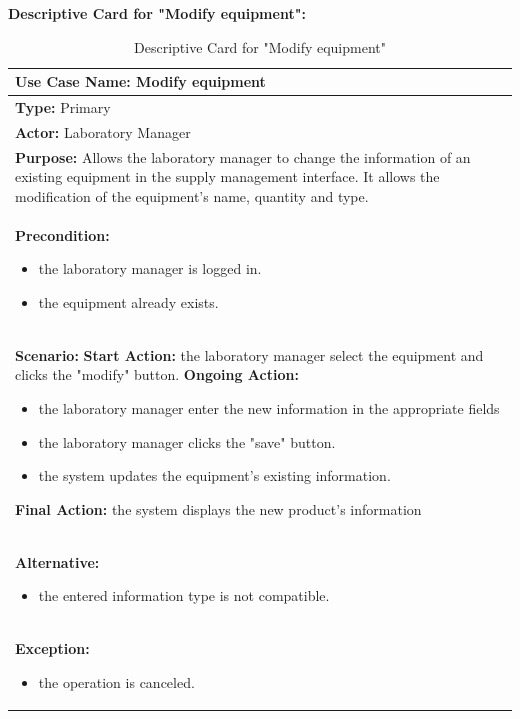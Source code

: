 \documentclass{article}
\begin{document}
\newpage

\textbf{Descriptive Card for "Modify equipment":}

\begin{table}[h]
\setlength{\tabcolsep}{10pt}
\renewcommand{\arraystretch}{1.5}
    \begin{tabular}{|p{\linewidth}|}
        \hline
        \textbf{Use Case Name:} Modify equipment\\ 
        \hline
        \textbf{Type:} Primary\\ 
        \hline
        \textbf{Actor:} Laboratory Manager\\ 
        \hline
        \textbf{Purpose:} Allows the laboratory manager to change the information of an existing equipment in the supply management interface. It allows the modification of the equipment's name, quantity and type.\\ 
        \hline
        \textbf{Precondition:}
        \begin{itemize}
            \item the laboratory manager is logged in.
            \item the equipment already exists.
        \end{itemize}\\ 
        \hline
        \textbf{Scenario:}
        \vspace{0.2cm}
        \newline
        \vspace{0.2cm}
        \textbf{Start Action:} the laboratory manager select the equipment and clicks the "modify" button.
        \newline
        \textbf{Ongoing Action:}  
        \begin{itemize}
            \item the laboratory manager enter the new information in the appropriate fields
            \item the laboratory manager clicks the "save" button.
            \item the system updates the equipment's existing information.
        \end{itemize}
        \textbf{Final Action:} the system displays the new product's information \\
        \hline
        \textbf{Alternative:} 
        \begin{itemize}
            \item the entered information type is not compatible.
        \end{itemize}\\ 
        \hline
        \textbf{Exception:}
        \begin{itemize}
            \item the operation is canceled. 
        \end{itemize}\\ 
        \hline
    \end{tabular}
    \caption{Descriptive Card for "Modify equipment"}
    \label{tab:my-table}
\end{table}
\end{document}

